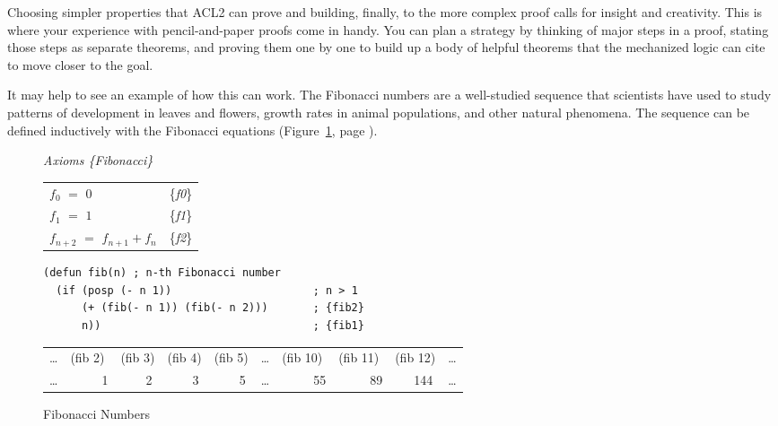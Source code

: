 Choosing simpler properties that ACL2 can prove
and building, finally, to the more complex proof
calls for insight and creativity.
This is where your experience with pencil-and-paper proofs
come in handy.
You can plan a strategy by thinking of major steps
in a proof, stating those steps as separate theorems,
and proving them one by one to build up a body
of helpful theorems that the mechanized logic
can cite to move closer to the goal.

It may help to see an example of how this can work.
The Fibonacci numbers are a well-studied sequence that
scientists have used to study
patterns of development in leaves and flowers,
growth rates in animal populations,
and other natural phenomena.
The sequence can be defined inductively
with the Fibonacci equations
(Figure~\ref{fig:Fibonacci-axioms}, page \pageref{fig:Fibonacci-axioms}).

\begin{figure}
\begin{center}
\emph{Axioms \{Fibonacci\}}
\begin{tabular}{ll}
$f_0$ $=$ $0$                   & \{\emph{f0}\} \\
$f_1$ $=$ $1$                   & \{\emph{f1}\} \\
$f_{n+2}$ $=$ $f_{n+1} + f_{n}$ & \{\emph{f2}\} \\
\end{tabular}
\begin{Verbatim}
(defun fib(n) ; n-th Fibonacci number
  (if (posp (- n 1))                      ; n > 1
      (+ (fib(- n 1)) (fib(- n 2)))       ; {fib2}
      n))                                 ; {fib1}
\end{Verbatim}
\begin{tabular}{llllllllll}
\dots & (fib 2) & (fib 3) & (fib 4) & (fib 5) & \dots & (fib 10) & (fib 11) & (fib 12) & \dots \\
\dots & ~~~~~1  &  ~~~~2  &  ~~~~3  &  ~~~~5  & \dots &  ~~~~~55 &  ~~~~~89 & ~~~144   & \dots \\
\end{tabular}
\end{center}
\caption{Fibonacci Numbers}
\label{fig:Fibonacci-axioms}
\end{figure}


